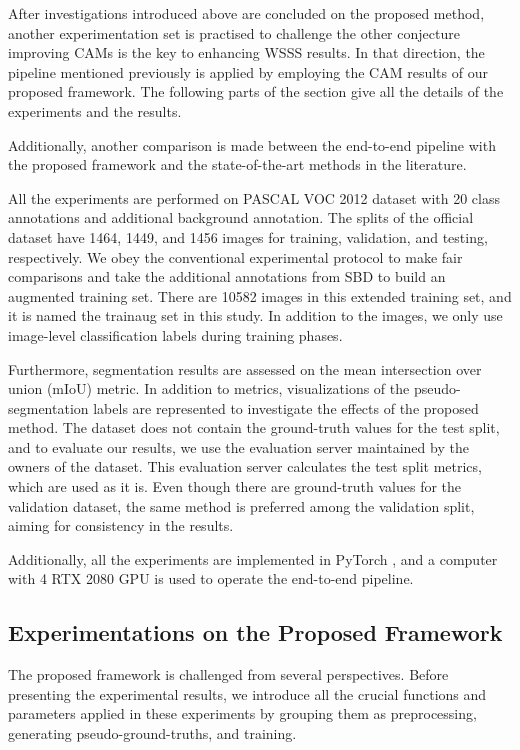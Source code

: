 \documentclass[sn-mathphys]{sn-jnl}
\theoremstyle{thmstyleone}
\theoremstyle{thmstyletwo}\newtheorem{example}{Example}\newtheorem{remark}{Remark}
\theoremstyle{thmstylethree}\newtheorem{definition}{Definition}
\begin{document}
After investigations introduced above are concluded on the proposed method, another experimentation set is practised to challenge the other conjecture improving CAMs is the key to enhancing WSSS results. In that direction, the pipeline mentioned previously is applied by employing the CAM results of our proposed framework. The following parts of the section give all the details of the experiments and the results.

Additionally, another comparison is made between the end-to-end pipeline with the proposed framework and the state-of-the-art methods in the literature.

All the experiments are performed on PASCAL VOC 2012 dataset \cite{Everingham10} with 20 class annotations and additional background annotation. The splits of the official dataset have 1464, 1449, and 1456 images for training, validation, and testing, respectively. We obey the conventional experimental protocol to make fair comparisons and take the additional annotations from SBD \cite{BharathICCV2011} to build an augmented training set. There are 10582 images in this extended training set, and it is named the trainaug set in this study. In addition to the images, we only use image-level classification labels during training phases. 

Furthermore, segmentation results are assessed on the mean intersection over union (mIoU) metric. In addition to metrics, visualizations of the pseudo-segmentation labels are represented to investigate the effects of the proposed method. The dataset does not contain the ground-truth values for the test split, and to evaluate our results, we use the evaluation server maintained by the owners of the dataset. This evaluation server calculates the test split metrics, which are used as it is. Even though there are ground-truth values for the validation dataset, the same method is preferred among the validation split, aiming for consistency in the results.

Additionally, all the experiments are implemented in PyTorch \cite{NEURIPS2019_9015}, and a computer with 4 RTX 2080 GPU is used to operate the end-to-end pipeline.

\subsection{Experimentations on the Proposed Framework}

The proposed framework is challenged from several perspectives. Before presenting the experimental results, we introduce all the crucial functions and parameters applied in these experiments by grouping them as preprocessing, generating pseudo-ground-truths, and training.
\end{document}
